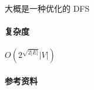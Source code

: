 大概是一种优化的 DFS

\paragraph{复杂度} \(O\left(2^{\sqrt{2|E|}}|V|\right)\)

\paragraph{参考资料} \cite{yoichi2012exponential}